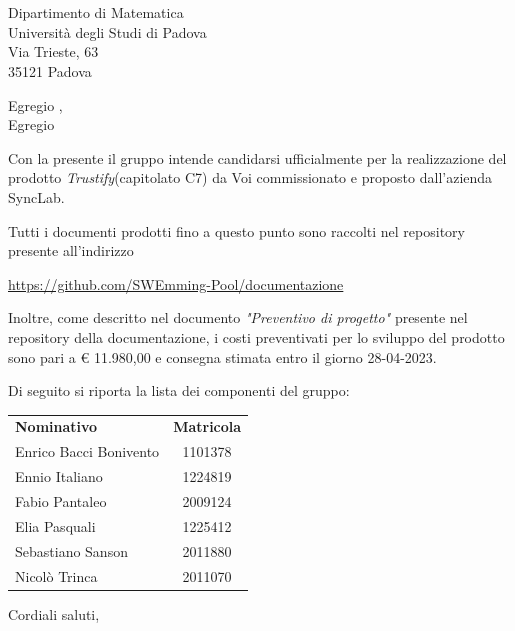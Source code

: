 \documentclass[12pt, boldsubject, italicsignature, noindent]{letteracdp}
\date{}
\renewcommand{\capName}{\textit{Trustify}} %
\renewcommand{\capCode}{C7} %
\renewcommand{\capProposer}{SyncLab} %
\begin{document}
\begin{letter}{
    \Vardanega \\
    \Cardin \\
    Dipartimento di Matematica \\
    Università degli Studi di Padova \\
    Via Trieste, 63 \\ 35121 Padova
}

\opening{Egregio \vardanega,\\ Egregio \cardin}

Con la presente il gruppo \groupName intende candidarsi ufficialmente per la realizzazione del prodotto \capName (capitolato \capCode) da Voi commissionato e proposto dall'azienda \capProposer.

Tutti i documenti prodotti fino a questo punto sono raccolti nel repository presente all'indirizzo 
\begin{center}
    \url{https://github.com/SWEmming-Pool/documentazione}
\end{center}

Inoltre, come descritto nel documento \textit{"Preventivo di progetto"} presente nel repository della documentazione, i costi preventivati per lo sviluppo del prodotto sono pari a \euro{} 11.980,00 e consegna stimata entro il giorno 28-04-2023. 

\pagebreak

Di seguito si riporta la lista dei componenti del gruppo:

\begin{center}
    \begin{tabular}{l|c}
    \textbf{Nominativo} & \textbf{Matricola} \\
    Enrico Bacci Bonivento & 1101378 \\
	Ennio Italiano & 1224819 \\
	Fabio Pantaleo & 2009124 \\     
	Elia Pasquali & 1225412 \\	     
	Sebastiano Sanson & 2011880 \\
    Nicolò Trinca & 2011070
   \end{tabular}
\end{center}

\closing{Cordiali saluti,}

\end{letter}
\end{document}
